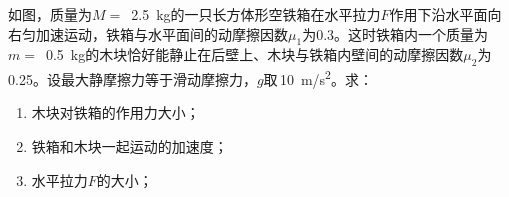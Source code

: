 如图，质量为\(M=\) \,\qty{2.5}{kg}的一只长方体形空铁箱在水平拉力\(F\)作用下沿水平面向右匀加速运动，铁箱与水平面间的动摩擦因数\(\mu_1\)为0.3。这时铁箱内一个质量为\(m=\) \,\qty{0.5}{kg}的木块恰好能静止在后壁上、木块与铁箱内壁间的动摩擦因数\(\mu_2\)为0.25。设最大静摩擦力等于滑动摩擦力，\(g\)取\,\qty{10}{m/s^2}。求：
\begin{enumerate}
    \item 木块对铁箱的作用力大小；
    \item 铁箱和木块一起运动的加速度；
    \item 水平拉力\(F\)的大小；
\end{enumerate}
